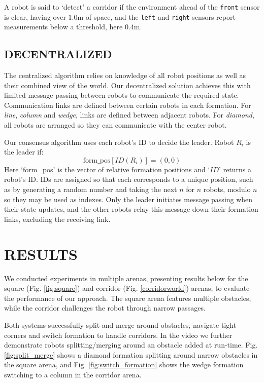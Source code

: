 \documentclass[letterpaper, 10 pt, conference]{ieeeconf}  %
\begin{document}
A robot is said to `detect' a corridor if the environment ahead of the \texttt{front} sensor is clear, having over $1.0$m of space, and the \texttt{left} and \texttt{right} sensors report measurements below a threshold, here $0.4$m.

\subsection{DECENTRALIZED}

The centralized algorithm relies on knowledge of all robot positions as well as their combined view of the world. Our decentralized solution achieves this with limited message passing between robots to communicate the required state. Communication links are defined between certain robots in each formation. For \textit{line}, \textit{column} and \textit{wedge}, links are defined between adjacent robots. For \textit{diamond}, all robots are arranged so they can communicate with the center robot.

Our consensus algorithm uses each robot's ID to decide the leader. Robot $R_i$ is the leader if:
\[\text{form\_pos}[ID(R_i)] = (0,0)\]
Here `form\_pos' is the vector of relative formation positions and `$ID$' returns a robot's ID. IDs are assigned so that each corresponds to a unique position, such as by generating a random number and taking the next $n$ for $n$ robots, modulo $n$ so they may be used as indexes. Only the leader initiates message passing when their state updates, and the other robots relay this message down their formation links, excluding the receiving link.

\section{RESULTS}
We conducted experiments in multiple arenas, presenting results below for the square (Fig. \ref{fig:square}) and corridor (Fig. \ref{corridorworld}) arenas, to evaluate the performance of our approach. The square arena features multiple obstacles, while the corridor challenges the robot through narrow passages.

Both systems successfully split-and-merge around obstacles, navigate tight corners and switch formation to handle corridors. In the video we further demonstrate robots splitting/merging around an obstacle added at run-time. Fig. \ref{fig:split_merge} shows a diamond formation splitting around narrow obstacles in the square arena, and Fig. \ref{fig:switch_formation} shows the wedge formation switching to a column in the corridor arena.
\end{document}
